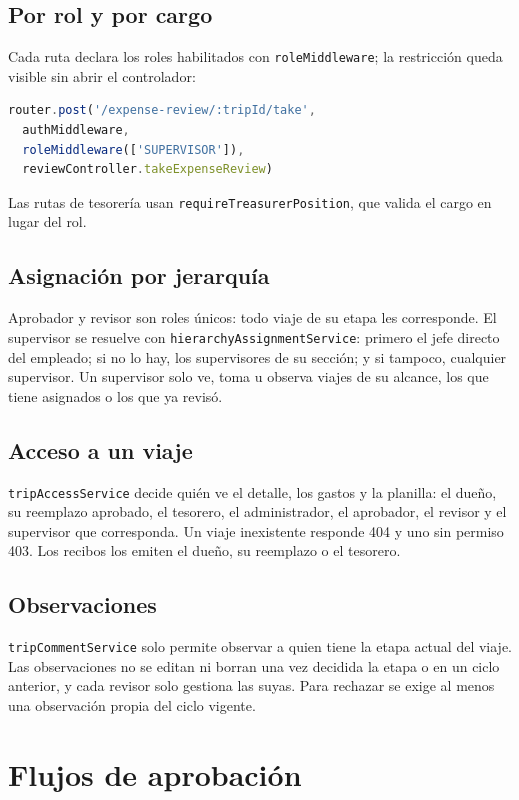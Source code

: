 \documentclass[11pt,letterpaper]{article}
\newcommand{\code}[1]{\nolinkurl{#1}}
\begin{document}
\subsection{Por rol y por cargo}
Cada ruta declara los roles habilitados con \code{roleMiddleware}; la restricción queda visible sin abrir el controlador:

\begin{lstlisting}[language=JavaScript]
router.post('/expense-review/:tripId/take',
  authMiddleware,
  roleMiddleware(['SUPERVISOR']),
  reviewController.takeExpenseReview)
\end{lstlisting}

Las rutas de tesorería usan \code{requireTreasurerPosition}, que valida el cargo en lugar del rol.

\subsection{Asignación por jerarquía}
Aprobador y revisor son roles únicos: todo viaje de su etapa les corresponde. El supervisor se resuelve con \code{hierarchyAssignmentService}: primero el jefe directo del empleado; si no lo hay, los supervisores de su sección; y si tampoco, cualquier supervisor. Un supervisor solo ve, toma u observa viajes de su alcance, los que tiene asignados o los que ya revisó.

\subsection{Acceso a un viaje}
\code{tripAccessService} decide quién ve el detalle, los gastos y la planilla: el dueño, su reemplazo aprobado, el tesorero, el administrador, el aprobador, el revisor y el supervisor que corresponda. Un viaje inexistente responde 404 y uno sin permiso 403. Los recibos los emiten el dueño, su reemplazo o el tesorero.

\subsection{Observaciones}
\code{tripCommentService} solo permite observar a quien tiene la etapa actual del viaje. Las observaciones no se editan ni borran una vez decidida la etapa o en un ciclo anterior, y cada revisor solo gestiona las suyas. Para rechazar se exige al menos una observación propia del ciclo vigente.

\section{Flujos de aprobación}
\end{document}
